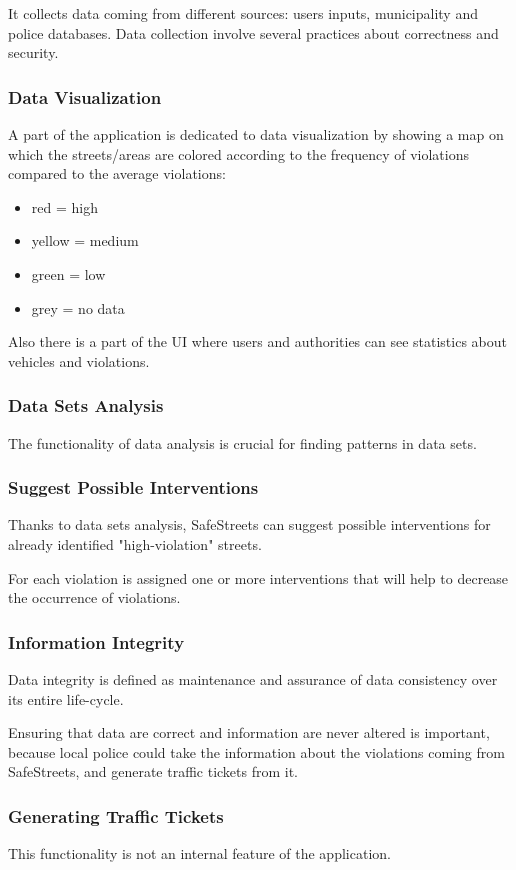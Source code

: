 It collects data coming from different sources: users inputs, municipality and police databases.
Data collection involve several practices about correctness and security.

\subsubsection{Data Visualization}
A part of the application is dedicated to data visualization by showing a map on which the streets/areas are colored according to the frequency of violations compared to the average violations: 
\begin{itemize}
\item red = high
\item yellow = medium
\item green = low
\item grey = no data
\end{itemize}

Also there is a part of the UI where users and authorities can see statistics about vehicles and violations.

\subsubsection{Data Sets Analysis}
The functionality of data analysis is crucial for finding patterns in data sets.

\subsubsection{Suggest Possible Interventions}
Thanks to data sets analysis, SafeStreets can suggest possible interventions for already identified "high-violation" streets.

For each violation is assigned one or more interventions that will help to decrease the occurrence of violations.


\subsubsection{Information Integrity}
Data integrity is defined as maintenance and assurance of data consistency over its entire life-cycle.

Ensuring that data are correct and information are never altered is important, because local police could take the information about the violations coming from SafeStreets, and generate traffic tickets from it.

\subsubsection{Generating Traffic Tickets}
This functionality is not an internal feature of the application. 

